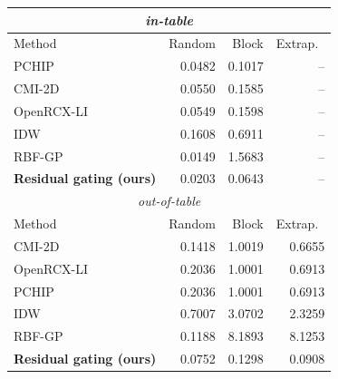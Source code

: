 \small
\begin{tabular}{lrrr}\toprule
\multicolumn{4}{c}{\emph{in-table}} \\\midrule
Method & Random & Block & Extrap.\ \\\midrule
PCHIP & 0.0482 & 0.1017 & -- \\
CMI-2D & 0.0550 & 0.1585 & -- \\
OpenRCX-LI & 0.0549 & 0.1598 & -- \\
IDW & 0.1608 & 0.6911 & -- \\
RBF-GP & 0.0149 & 1.5683 & -- \\
\textbf{Residual gating (ours)} & 0.0203 & 0.0643 & -- \\
\midrule\multicolumn{4}{c}{\emph{out-of-table}} \\\midrule
Method & Random & Block & Extrap.\ \\\midrule
CMI-2D & 0.1418 & 1.0019 & 0.6655 \\
OpenRCX-LI & 0.2036 & 1.0001 & 0.6913 \\
PCHIP & 0.2036 & 1.0001 & 0.6913 \\
IDW & 0.7007 & 3.0702 & 2.3259 \\
RBF-GP & 0.1188 & 8.1893 & 8.1253 \\
\textbf{Residual gating (ours)} & 0.0752 & 0.1298 & 0.0908 \\
\bottomrule\end{tabular}
